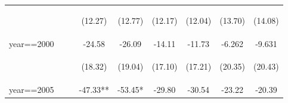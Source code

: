 \begin{landscape}
\begin{table}[htpb!]
\begin{center}
\begin{tabular}{lcccccccc}
	& \begin{footnotesize}		\end{footnotesize} & \begin{footnotesize}		\end{footnotesize} & \begin{footnotesize}	(12.27)	\end{footnotesize} & \begin{footnotesize}	(12.77)	\end{footnotesize} & \begin{footnotesize}	(12.17)	\end{footnotesize} & \begin{footnotesize}	(12.04)	\end{footnotesize} & \begin{footnotesize}	(13.70)	\end{footnotesize} & \begin{footnotesize}	(14.08)	\end{footnotesize} \\	
year==2000	&		&		&	-24.58	&	-26.09	&	-14.11	&	-11.73	&	-6.262	&	-9.631	\\	
	& \begin{footnotesize}		\end{footnotesize} & \begin{footnotesize}		\end{footnotesize} & \begin{footnotesize}	(18.32)	\end{footnotesize} & \begin{footnotesize}	(19.04)	\end{footnotesize} & \begin{footnotesize}	(17.10)	\end{footnotesize} & \begin{footnotesize}	(17.21)	\end{footnotesize} & \begin{footnotesize}	(20.35)	\end{footnotesize} & \begin{footnotesize}	(20.43)	\end{footnotesize} \\	
year==2005	&		&		&	-47.33**	&	-53.45*	&	-29.80	&	-30.54	&	-23.22	&	-20.39	\\	

\end{tabular}
\end{center}
\end{table}
\end{landscape}

